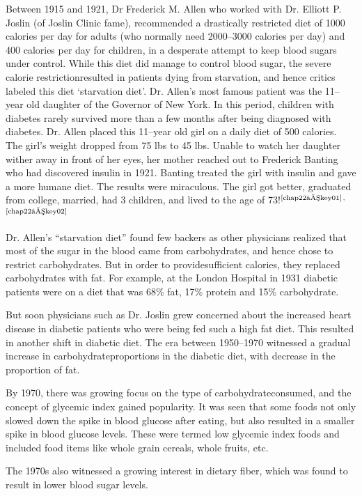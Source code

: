 Between 1915 and 1921, Dr Frederick M. Allen who worked with Dr. Elliott P. Joslin (of Joslin Clinic fame), recommended a drastically restricted diet of 1000 calories per day for adults (who normally need 2000–3000 calories per day) and 400 calories per day for children, in a desperate attempt to keep blood sugars under control. While this diet did manage to control blood sugar, the severe calorie restriction\break resulted in patients dying from starvation, and hence critics labeled this diet ‘starvation diet’. Dr. Allen’s most famous patient was the 11–year old daughter of the Governor of New York. In this period, children with diabetes rarely survived more than a few months after being dia\-gnosed with diabetes. Dr. Allen placed this 11–year old girl on a daily diet of 500 calories. The girl's weight dropped from 75 lbs to 45 lbs. Unable to watch her daughter wither away in front of her eyes, her mother reached out to Frederick Banting who had discovered insulin in 1921. Banting treated the girl with insulin and gave a more humane diet. The results were miraculous. The girl got better, graduated from college, married, had 3 children, and lived to the age of 73!$^{\text{\cite{chap22–key01}}}$$^,$$^{\text{\cite{chap22–key02}}}$

Dr. Allen’s “starvation diet” found few backers as other physicians realized that most of the sugar in the blood came from carbohydrates, and hence chose to restrict carbohydrates. But in order to provide\break sufficient calories, they replaced carbohydrates with fat. For example, at the London Hospital in 1931 diabetic patients were on a diet that was 68\% fat, 17\% protein and 15\% carbohydrate.

But soon physicians such as Dr. Joslin grew concerned about the increased heart disease in diabetic patients who were being fed such a high fat diet. This resulted in another shift in diabetic diet. The era between 1950–1970 witnessed a gradual increase in carbohydrate\break proportions in the diabetic diet, with decrease in the proportion of fat.

By 1970, there was growing focus on the type of carbohydrate\break consumed, and the concept of glycemic index gained popularity. It was seen that some foods not only slowed down the spike in blood glucose after eating, but also resulted in a smaller spike in blood glucose levels. These were termed low glycemic index foods and included food items like whole grain cereals, whole fruits, etc.

The 1970s also witnessed a growing interest in dietary fiber, which was found to result in lower blood sugar levels.

